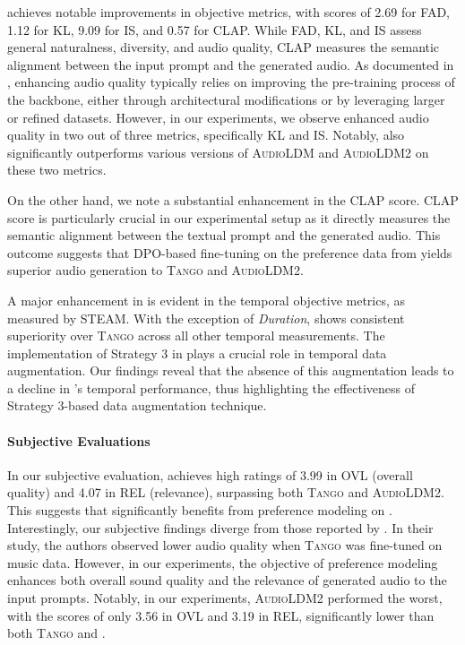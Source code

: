 \model{} achieves notable improvements in objective metrics, with scores of 2.69 for FAD, 1.12 for KL, 9.09 for IS, and 0.57 for CLAP. While FAD, KL, and IS assess general naturalness, diversity, and audio quality, CLAP measures the semantic alignment between the input prompt and the generated audio. As documented in \citet{melechovsky2024mustango}, enhancing audio quality typically relies on improving the pre-training process of the backbone, either through architectural modifications or by leveraging larger or refined datasets. However, in our experiments, we observe enhanced audio quality in two out of three metrics, specifically KL and IS. Notably, \model{} also significantly outperforms various versions of \textsc{AudioLDM} and \textsc{AudioLDM2} on these two metrics. 

On the other hand, we note a substantial enhancement in the CLAP score. CLAP score is particularly crucial in our experimental setup as it directly measures the semantic alignment between the textual prompt and the generated audio. This outcome suggests that DPO-based fine-tuning on the preference data from \dataset{} yields superior audio generation to \textsc{Tango} and \textsc{AudioLDM2}.

A major enhancement in \model{} is evident in the temporal objective metrics, as measured by STEAM. With the exception of \emph{Duration}, \model{} shows consistent superiority over \textsc{Tango} across all other temporal measurements. The implementation of Strategy 3 in \dataset{} plays a crucial role in temporal data augmentation. Our findings reveal that the absence of this augmentation leads to a decline in \model{}'s temporal performance, thus highlighting the effectiveness of Strategy 3-based data augmentation technique.

\paragraph{\bf Subjective Evaluations}
In our subjective evaluation, \model{} achieves high ratings of 3.99 in OVL (overall quality) and 4.07 in REL (relevance), surpassing both \textsc{Tango} and \textsc{AudioLDM2}. This suggests that \model{} significantly benefits from preference modeling on \dataset{}. Interestingly, our subjective findings diverge from those reported by \citet{melechovsky2024mustango}. In their study, the authors observed lower audio quality when \textsc{Tango} was fine-tuned on music data. However, in our experiments, the objective of preference modeling enhances both overall sound quality and the relevance of generated audio to the input prompts.
Notably, in our experiments, \textsc{AudioLDM2} performed the worst, with the scores of only 3.56 in OVL and 3.19 in REL, significantly lower than both \textsc{Tango} and \model{}.

